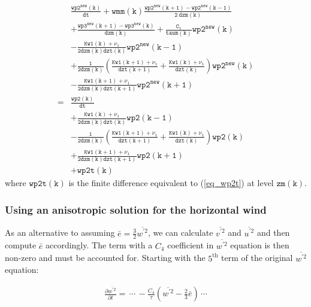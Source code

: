 \documentclass[11pt,fleqn]{article}
\newcommand{\ptlder}[2]{\frac{\partial #1}{\partial #2}}
\begin{document}
\begin{equation}
\label{eq_wp2e}
\begin{split}
& \mathtt{
  \frac{wp2^{new}(k)}{dt}
+ wmm(k) \frac{wp2^{new}(k+1) - wp2^{new}(k-1)}{2 \ dzm(k)}
  } \\
& \mathtt{
+ \frac{wp3^{new}(k+1) - wp3^{new}(k)}{dzm(k)}
+ \frac{C_1}{taum(k)} wp2^{new}(k)
  } \\
& \mathtt{
  -\frac{Kw1(k)+\nu_1}{2 dzm(k)dzt(k)} wp2^{new}(k-1)
  } \\
& \mathtt{
  +\frac{1}{2 dzm(k)} \left(  \frac{Kw1(k+1)+\nu_1}{dzt(k+1)} 
                            + \frac{Kw1(k)+\nu_1}{dzt(k)} \right) wp2^{new}(k)
  } \\
& \mathtt{
  -\frac{Kw1(k+1)+\nu_1}{2 dzm(k)dzt(k+1)} wp2^{new}(k+1)
  } \\
=& \mathtt{
  \frac{wp2(k)}{dt}
  } \\
& \mathtt{
  +\frac{Kw1(k)+\nu_1}{2 dzm(k)dzt(k)} wp2(k-1)
  } \\
& \mathtt{
  -\frac{1}{2 dzm(k)} \left(  \frac{Kw1(k+1)+\nu_1}{dzt(k+1)} 
                            + \frac{Kw1(k)+\nu_1}{dzt(k)} \right) wp2(k)
  } \\
& \mathtt{
  +\frac{Kw1(k+1)+\nu_1}{2 dzm(k)dzt(k+1)} wp2(k+1)
  } \\
& \mathtt{
  + wp2t(k)
  }
\end{split}
\end{equation}
%
where $\mathtt{wp2t(k)}$ is the finite difference equivalent to (\ref{eq_wp2t}) 
at level $\mathtt{zm(k)}$.

\subsubsection{Using an anisotropic solution for the horizontal wind} 

As an alternative to assuming $\bar{e} = \frac{3}{2} \overline{w^{'2}}$, we
can calculate $\overline{v^{'2}}$ and $\overline{u^{'2}}$ and then 
compute $\bar{e}$ accordingly.  The term with a $C_4$ coefficient in 
$\overline{w^{'2}}$ equation is then non-zero and must be accounted for.  
Starting with 
the $5^{\mathrm{th}}$ term of the original $\overline{w^{'2}}$ equation:

\begin{equation}
\begin{split}
\ptlder{\overline{w^{'2}}}{t} =
  \, \cdots \,
  - \frac{C_4}{\tau} \left( \overline{w^{'2}} - \frac{2}{3} \bar{e} \right)
  \, \cdots
\end{split}
\end{equation}
%
\end{document}
